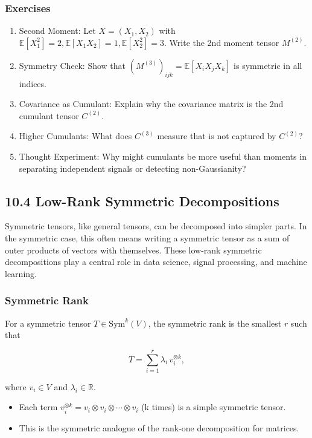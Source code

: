 \documentclass[
  letterpaper,
  DIV=11,
  numbers=noendperiod]{scrreprt}
\providecommand{\tightlist}{%
  \setlength{\itemsep}{0pt}\setlength{\parskip}{0pt}}
\begin{document}
\subsubsection{Exercises}\label{exercises-38}

\begin{enumerate}
\def\labelenumi{\arabic{enumi}.}
\item
  Second Moment: Let \(X = (X_1,X_2)\) with
  \(\mathbb{E}[X_1^2]=2, \mathbb{E}[X_1X_2]=1, \mathbb{E}[X_2^2]=3\).
  Write the 2nd moment tensor \(M^{(2)}\).
\item
  Symmetry Check: Show that
  \((M^{(3)})_{ijk} = \mathbb{E}[X_i X_j X_k]\) is symmetric in all
  indices.
\item
  Covariance as Cumulant: Explain why the covariance matrix is the 2nd
  cumulant tensor \(C^{(2)}\).
\item
  Higher Cumulants: What does \(C^{(3)}\) measure that is not captured
  by \(C^{(2)}\)?
\item
  Thought Experiment: Why might cumulants be more useful than moments in
  separating independent signals or detecting non-Gaussianity?
\end{enumerate}

\subsection{10.4 Low-Rank Symmetric
Decompositions}\label{low-rank-symmetric-decompositions}

Symmetric tensors, like general tensors, can be decomposed into simpler
parts. In the symmetric case, this often means writing a symmetric
tensor as a sum of outer products of vectors with themselves. These
low-rank symmetric decompositions play a central role in data science,
signal processing, and machine learning.

\subsubsection{Symmetric Rank}\label{symmetric-rank}

For a symmetric tensor \(T \in \mathrm{Sym}^k(V)\), the symmetric rank
is the smallest \(r\) such that

\[
T = \sum_{i=1}^r \lambda_i \, v_i^{\otimes k},
\]

where \(v_i \in V\) and \(\lambda_i \in \mathbb{R}\).

\begin{itemize}
\tightlist
\item
  Each term
  \(v_i^{\otimes k} = v_i \otimes v_i \otimes \cdots \otimes v_i\) (k
  times) is a simple symmetric tensor.
\item
  This is the symmetric analogue of the rank-one decomposition for
  matrices.
\end{itemize}
\end{document}
